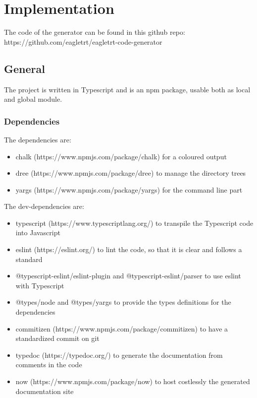 \section{\huge{Implementation}}
The code of the generator can be found in this github repo: https://github.com/eagletrt/eagletrt-code-generator

\subsection{General}
The project is written in Typescript and is an npm package, usable both as local and global module. 

\subsubsection{Dependencies}
The dependencies are:

\begin{itemize}
    \item chalk (https://www.npmjs.com/package/chalk) for a coloured output
    \item dree (https://www.npmjs.com/package/dree) to manage the directory trees
    \item yargs (https://www.npmjs.com/package/yargs) for the command line part
\end{itemize}

The dev-dependencies are:

\begin{itemize}
    \item typescript (https://www.typescriptlang.org/) to transpile the Typescript code into Javascript
    \item eslint (https://eslint.org/) to lint the code, so that it is clear and follows a standard
    \item @typescript-eslint/eslint-plugin and @typescript-eslint/parser to use eslint with Typescript
    \item @types/node and @types/yargs to provide the types definitions for the dependencies
    \item commitizen (https://www.npmjs.com/package/commitizen) to have a standardized commit on git
    \item typedoc (https://typedoc.org/) to generate the documentation from comments in the code
    \item now (https://www.npmjs.com/package/now) to host costlessly the generated documentation site
\end{itemize}

